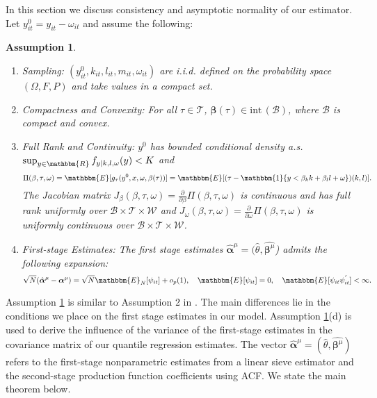 \documentclass[12pt]{article}
\newtheorem{assump}{Assumption}[section]
\begin{document}
\begin{appendices}
In this section we discuss consistency and asymptotic normality of our estimator. Let $y^{0}_{it}=y_{it}-\omega_{it}$ and assume the following:
\begin{assump} \label{asymptotics1}
\leavevmode
	\begin{enumerate}[label=(\alph*)]
		\item Sampling: $(y^{0}_{it}, k_{it}, l_{it}, m_{it}, \omega_{it})$ are i.i.d. defined on the probability space $(\Omega, F, P)$ and take values in a compact set.
		\item Compactness and Convexity: For all $\tau\in \mathcal{T}$, $\boldsymbol{\beta}(\tau)\in \text{int} \, (\mathcal{B})$, where $\mathcal{B}$ is compact and convex.
		\item Full Rank and Continuity: $y^{0}$ has bounded conditional density a.s. $\sup_{y\in \mathbbm{R}}f_{y|k,l,\omega}(y)<K$ and
		\begin{equation*}
		\Pi(\beta, \tau, \omega)=\mathbbm{E}[g_{\tau}(y^{0},x,\omega,\beta(\tau))]=\mathbbm{E}[(\tau-\mathbbm{1}\{y<\beta_{k}k+\beta_{l}l+\omega\})(k,l)].
		\end{equation*}
		The Jacobian matrix $J_{\beta}(\beta, \tau, \omega)=\frac{\partial}{\partial\beta}\Pi(\beta, \tau, \omega)$ is continuous and has full rank uniformly over $\mathcal{B}\times\mathcal{T}\times\mathcal{W}$ and $J_{\omega}(\beta, \tau, \omega)=\frac{\partial}{\partial\omega}\Pi(\beta, \tau, \omega)$ is uniformly continuous over $\mathcal{B}\times\mathcal{T}\times\mathcal{W}$.
		\item First-stage Estimates: The first stage estimates $\hat{\boldsymbol{\alpha}}^{\mu}=(\hat{\theta}, \hat{\boldsymbol{\beta}^{\mu}}$) admits the following expansion:
		\begin{equation*}
			\sqrt{N}(\hat{\boldsymbol{\alpha}}^{\mu}-\boldsymbol{\alpha}^{\mu})=\sqrt{N}\mathbbm{E}_{N}[\psi_{it}]+o_{p}(1),\quad \mathbbm{E}[\psi_{it}]=0, \quad \mathbbm{E}[\psi_{it}\psi_{it}^{'}]<\infty.
		\end{equation*}
	\end{enumerate}
\end{assump}
Assumption \ref{asymptotics1} is similar to Assumption 2 in \cite{Chernozhukov2006}. The main differences lie in the conditions we place on the first stage estimates in our model. Assumption \ref{asymptotics1}(d) is used to derive the influence of the variance of the first-stage estimates in the covariance matrix of our quantile regression estimates. The vector $\hat{\boldsymbol{\alpha}}^{\mu}=(\hat{\theta}, \hat{\boldsymbol{\beta}^{\mu}})$ refers to the first-stage nonparametric estimates from a linear sieve estimator and the second-stage production function coefficients using ACF. We state the main theorem below.

\end{appendices}
\end{document}
